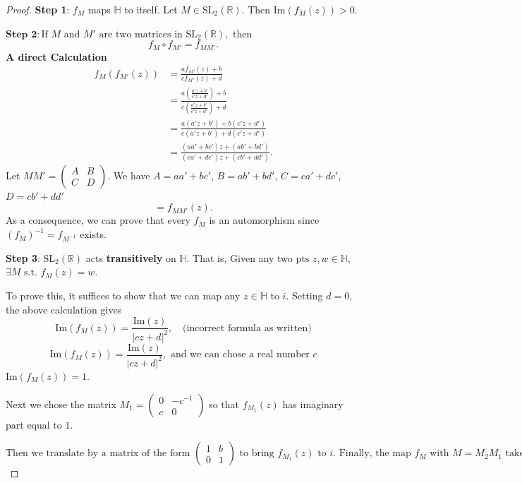 \documentclass{article}
\begin{document}
\begin{proof}
\textbf{Step 1}: $f_M$ maps $\mathbb{H}$ to itself.
Let $M \in \text{SL}_2(\mathbb{R})$. Then $\text{Im}(f_M(z)) > 0$.


$\textbf{Step 2}: \text{If } M \text{ and } M' \text{ are two matrices in } \text{SL}_2(\mathbb{R}), \text{ then }$
$$f_M \circ f_{M'} = f_{MM'}.$$
\textbf{A direct Calculation}
\begin{align*}
f_M(f_{M'}(z)) &= \frac{a f_{M'}(z) + b}{c f_{M'}(z) + d} \\
&= \frac{a \left( \frac{a' z + b'}{c' z + d'} \right) + b}{c \left( \frac{a' z + b'}{c' z + d'} \right) + d} \\
&= \frac{a (a' z + b') + b (c' z + d')}{c (a' z + b') + d (c' z + d')} \\
&= \frac{(a a' + b c') z + (a b' + b d')}{(c a' + d c') z + (c b' + d d')}.
\end{align*}
Let $M M' = \begin{pmatrix} A & B \\ C & D \end{pmatrix}$. We have $A = a a' + b c'$, $B = a b' + b d'$, $C = c a' + d c'$, $D = c b' + d d'$
$$= f_{MM'}(z).$$
As a consequence, we can prove that every $f_M$ is an automorphism since $(f_M)^{-1} = f_{M^{-1}}$ exists.

\textbf{Step 3}: $\text{SL}_2(\mathbb{R})$ acts \textbf{transitively} on $\mathbb{H}$. That is,
Given any two $\text{pts } z, w \in \mathbb{H}$, $\exists M \text{ s.t. } f_M(z) = w$.

To prove this, it suffices to show that we can map any $z \in \mathbb{H}$ to $i$.
Setting $d = 0$, the above calculation gives
$$\text{Im}(f_M(z)) = \frac{\text{Im}(z)}{|cz + d|^2}, \quad \text{(incorrect formula as written)}$$
$$\text{Im}(f_M(z)) = \frac{\text{Im}(z)}{|cz + d|^2}, \text{ and we can chose a real number } c$$
 $\text{Im}(f_M(z)) = 1$.

Next we chose the matrix $M_1 = \begin{pmatrix} 0 & -c^{-1} \\ c & 0 \end{pmatrix}$
so that $f_{M_1}(z)$ has imaginary part equal to $1$.

$\text{Then we translate by a matrix of the form } \begin{pmatrix} 1 & b \\ 0 & 1 \end{pmatrix} \text{ to bring } f_{M_1}(z) \text{ to } i. \text{ Finally, the map } f_M \text{ with } M = M_2 M_1 \text{ takes } z \text{ to } i.$


\end{proof}
\end{document}
